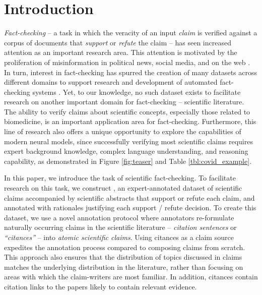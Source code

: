 \section{Introduction} \label{sec:introduction}



\emph{Fact-checking} -- a task in which the veracity of an input \emph{claim} is verified against a corpus of documents that \emph{support} or \emph{refute} the claim -- has seen increased attention as an important research area. This attention is motivated by the proliferation of misinformation in political news, social media, and on the web . In turn, interest in fact-checking has spurred the creation of many datasets across different domains to support research and development of automated fact-checking systems .
Yet, to our knowledge, no such dataset exists to facilitate research on another important domain for fact-checking -- scientific literature. The ability to verify claims about scientific concepts, especially those related to biomedicine, is an important application area for fact-checking.  Furthermore, this line of research also offers a unique opportunity to explore the capabilities of modern neural models, since
successfully verifying most scientific claims requires expert background knowledge, complex language understanding, and reasoning capability, as demonstrated in Figure \ref{fig:teaser} and Table \ref{tbl:covid_example}.

% 


In this paper, we introduce the task of scientific fact-checking. To facilitate research on this task, we construct \ours, an expert-annotated dataset of \numclaims scientific claims accompanied by scientific abstracts that support or refute each claim, and annotated with rationales justifying each support / refute decision. To create this dataset, we use a novel annotation protocol where annotators re-formulate naturally occurring claims in the scientific literature -- \emph{citation sentences} or \emph{``citances''} \cite{Nakov2004CitancesC} -- into \emph{atomic scientific claims}. Using citances as a claim source expedites the annotation process compared to composing claims from scratch. This approach also ensures that the distribution of topics discussed in \ours claims matches the underlying distribution in the literature, rather than focusing on areas with which the claim-writers are most familiar. In addition, citances contain citation links to the papers likely to contain relevant evidence.

